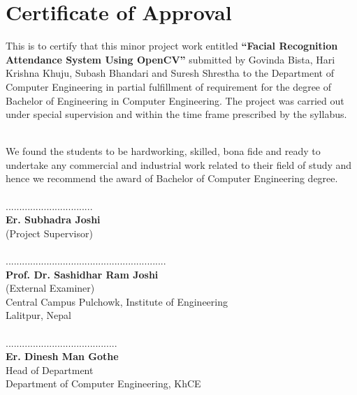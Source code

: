 
		\large
			\section{Certificate of Approval}
		\begin{normalsize}
			\justify
This is to  certify that this minor project  work entitled \textbf{“Facial Recognition Attendance System Using OpenCV”} submitted by Govinda Bista, Hari Krishna Khuju,
Subash Bhandari and Suresh Shrestha to the Department of Computer Engineering in partial fulfillment of requirement for
the degree of Bachelor of Engineering in Computer Engineering. The project was
carried out under special supervision and within the time frame prescribed by the
syllabus.
\end{normalsize}
\\
We found the students to be hardworking, skilled, bona fide and ready to undertake any
commercial and industrial work related to their field of study and hence we recommend
the award of Bachelor of Computer Engineering degree.\\
\vspace{1.5cm}
\\
................................\\
\textbf{Er. Subhadra Joshi}\\
(Project Supervisor)\\
\vspace{1.5cm}
\\
...........................................................\\
\textbf{Prof. Dr. Sashidhar Ram Joshi}\\
(External Examiner)\\
Central Campus Pulchowk, Institute of Engineering\\
Lalitpur, Nepal\\
\vspace{1.5cm}\\
.........................................\\
\textbf{Er. Dinesh Man Gothe}\\
Head of Department\\
Department of Computer Engineering, KhCE\\
        \break



		\large
